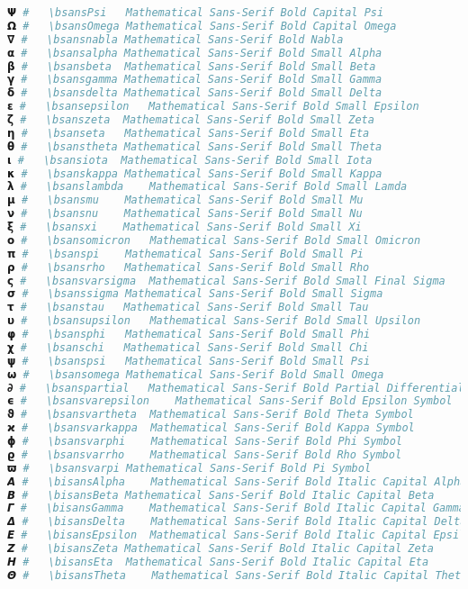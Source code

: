 \begin{lstlisting}[language=Julia]
𝝭 #   \bsansPsi   Mathematical Sans-Serif Bold Capital Psi
𝝮 #   \bsansOmega Mathematical Sans-Serif Bold Capital Omega
𝝯 #   \bsansnabla Mathematical Sans-Serif Bold Nabla
𝝰 #   \bsansalpha Mathematical Sans-Serif Bold Small Alpha
𝝱 #   \bsansbeta  Mathematical Sans-Serif Bold Small Beta
𝝲 #   \bsansgamma Mathematical Sans-Serif Bold Small Gamma
𝝳 #   \bsansdelta Mathematical Sans-Serif Bold Small Delta
𝝴 #   \bsansepsilon   Mathematical Sans-Serif Bold Small Epsilon
𝝵 #   \bsanszeta  Mathematical Sans-Serif Bold Small Zeta
𝝶 #   \bsanseta   Mathematical Sans-Serif Bold Small Eta
𝝷 #   \bsanstheta Mathematical Sans-Serif Bold Small Theta
𝝸 #   \bsansiota  Mathematical Sans-Serif Bold Small Iota
𝝹 #   \bsanskappa Mathematical Sans-Serif Bold Small Kappa
𝝺 #   \bsanslambda    Mathematical Sans-Serif Bold Small Lamda
𝝻 #   \bsansmu    Mathematical Sans-Serif Bold Small Mu
𝝼 #   \bsansnu    Mathematical Sans-Serif Bold Small Nu
𝝽 #   \bsansxi    Mathematical Sans-Serif Bold Small Xi
𝝾 #   \bsansomicron   Mathematical Sans-Serif Bold Small Omicron
𝝿 #   \bsanspi    Mathematical Sans-Serif Bold Small Pi
𝞀 #   \bsansrho   Mathematical Sans-Serif Bold Small Rho
𝞁 #   \bsansvarsigma  Mathematical Sans-Serif Bold Small Final Sigma
𝞂 #   \bsanssigma Mathematical Sans-Serif Bold Small Sigma
𝞃 #   \bsanstau   Mathematical Sans-Serif Bold Small Tau
𝞄 #   \bsansupsilon   Mathematical Sans-Serif Bold Small Upsilon
𝞅 #   \bsansphi   Mathematical Sans-Serif Bold Small Phi
𝞆 #   \bsanschi   Mathematical Sans-Serif Bold Small Chi
𝞇 #   \bsanspsi   Mathematical Sans-Serif Bold Small Psi
𝞈 #   \bsansomega Mathematical Sans-Serif Bold Small Omega
𝞉 #   \bsanspartial   Mathematical Sans-Serif Bold Partial Differential
𝞊 #   \bsansvarepsilon    Mathematical Sans-Serif Bold Epsilon Symbol
𝞋 #   \bsansvartheta  Mathematical Sans-Serif Bold Theta Symbol
𝞌 #   \bsansvarkappa  Mathematical Sans-Serif Bold Kappa Symbol
𝞍 #   \bsansvarphi    Mathematical Sans-Serif Bold Phi Symbol
𝞎 #   \bsansvarrho    Mathematical Sans-Serif Bold Rho Symbol
𝞏 #   \bsansvarpi Mathematical Sans-Serif Bold Pi Symbol
𝞐 #   \bisansAlpha    Mathematical Sans-Serif Bold Italic Capital Alpha
𝞑 #   \bisansBeta Mathematical Sans-Serif Bold Italic Capital Beta
𝞒 #   \bisansGamma    Mathematical Sans-Serif Bold Italic Capital Gamma
𝞓 #   \bisansDelta    Mathematical Sans-Serif Bold Italic Capital Delta
𝞔 #   \bisansEpsilon  Mathematical Sans-Serif Bold Italic Capital Epsilon
𝞕 #   \bisansZeta Mathematical Sans-Serif Bold Italic Capital Zeta
𝞖 #   \bisansEta  Mathematical Sans-Serif Bold Italic Capital Eta
𝞗 #   \bisansTheta    Mathematical Sans-Serif Bold Italic Capital Theta

\end{lstlisting}
